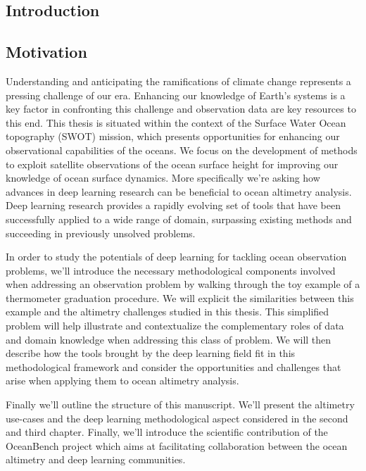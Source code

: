 \begin{bibunit}

\chapter*{Introduction}

  \section{Motivation}
Understanding and anticipating the ramifications of climate change represents a pressing challenge of our era.
Enhancing our knowledge of Earth's systems is a key factor in confronting this challenge and observation data are key resources to this end.
  This thesis is situated within the context of the Surface Water Ocean topography (SWOT)\cite{} mission, which presents opportunities for enhancing our observational capabilities of the oceans.
  We focus on the development of methods to exploit satellite observations of the ocean surface height for improving our knowledge of ocean surface dynamics. 
  More specifically we're asking how advances in deep learning research can be beneficial to ocean altimetry analysis.
  Deep learning research provides a rapidly evolving set of tools that have been successfully applied to a wide range of domain, surpassing existing methods and succeeding in previously unsolved problems.
  
  In order to study the potentials of deep learning for tackling ocean observation problems, we'll introduce the necessary methodological components involved when addressing an observation problem by walking through the toy example of a thermometer graduation procedure.
  We will explicit the similarities between this example and the altimetry challenges studied in this thesis.
 This simplified problem will help illustrate and contextualize the complementary roles of data and domain knowledge when addressing this class of problem. 
  We will then describe how the tools brought by the deep learning field fit in this methodological framework and consider the opportunities and challenges that arise when applying them to ocean altimetry analysis.

  Finally we'll outline the structure of this manuscript. We'll present the altimetry use-cases and the deep learning methodological aspect considered in the second and third chapter. Finally, we'll introduce the scientific contribution of the OceanBench project which aims at facilitating collaboration between the ocean altimetry and deep learning communities.
  



\end{bibunit}
